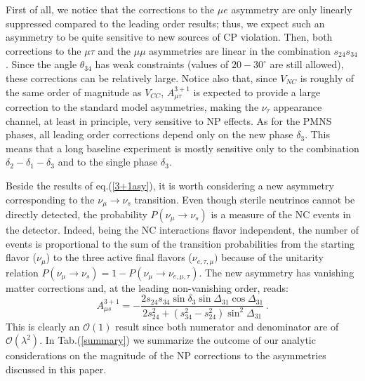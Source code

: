 \documentclass[12pt]{article}
\begin{document}
First of all, we notice that the corrections to the $\mu e$ asymmetry are only linearly  suppressed compared to the leading order results; thus, we expect such an asymmetry to be quite sensitive to new sources of CP violation. 
Then, both corrections to the $\mu\tau$ and the $\mu\mu$ asymmetries are linear in the combination $s_{24}s_{34}$. Since the angle $\theta_{34}$ has weak constraints (values of $20-30^\circ$ are still allowed), these corrections can be relatively large. Notice also that, since $V_{NC}$ is roughly of the same order of magnitude as $V_{CC}$, $A_{\mu\tau}^{3+1}$ is expected to provide a large correction to the standard model asymmetries, making the $\nu_\tau$ appearance channel, at least in principle, very sensitive to NP effects. 
As for the PMNS phases, all leading order corrections depend only on the new phase $\delta_3$. This means that a long baseline experiment is mostly sensitive only to the combination $\delta_2-\delta_1-\delta_3$ and to the single phase $\delta_3$. 



Beside the results of eq.(\ref{3+1asy}), it is worth considering a new asymmetry corresponding to the $\nu_\mu\to\nu_s$ transition. Even though sterile neutrinos cannot be directly detected, the probability $P(\nu_\mu\to\nu_s)$ is a measure of  the NC events in the detector. Indeed, being the NC interactions flavor independent, the number of events is proportional to the sum of the transition probabilities from the starting flavor ($\nu_\mu$) to the three active final flavors ($\nu_{e,\tau,\mu})$ because of the unitarity relation $P(\nu_\mu\to\nu_s)=1-P(\nu_\mu\to\nu_{e,\mu,\tau})$. The new asymmetry has vanishing matter corrections and, at the leading non-vanishing order, reads:
\begin{equation}
    A_{\mu s}^{3+1}=-\frac{2 s_{24}s_{34} \sin\delta_3 \sin{\Delta_{31}} \cos{\Delta_{31}}}{2s_{24}^2+(s_{34}^2-s_{24}^2) \sin^2{\Delta_{31}}}\,.
\end{equation}
This is clearly an $\mathcal{O}(1)$ result since both numerator and denominator are of $\mathcal{O}(\lambda^2)$. 
In Tab.(\ref{summary}) we summarize the outcome of our analytic considerations on the magnitude of the NP corrections to the asymmetries discussed in this paper. 
\end{document}
